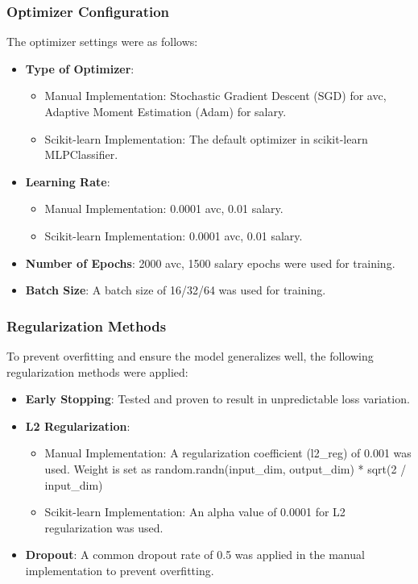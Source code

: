 \documentclass[a4paper,12pt]{article}
\begin{document}
\subsubsection{Optimizer Configuration}
The optimizer settings were as follows:
\begin{itemize}
    \item \textbf{Type of Optimizer}:
    \begin{itemize}
        \item Manual Implementation: Stochastic Gradient Descent (SGD) for avc, Adaptive Moment Estimation (Adam) for salary.
        \item Scikit-learn Implementation: The default optimizer in scikit-learn MLPClassifier.
    \end{itemize}
    \item \textbf{Learning Rate}:
    \begin{itemize}
        \item Manual Implementation: 0.0001 avc, 0.01 salary.
        \item Scikit-learn Implementation: 0.0001 avc, 0.01 salary.
    \end{itemize}
    \item \textbf{Number of Epochs}: 2000 avc, 1500 salary epochs were used for training.
    \item \textbf{Batch Size}: A batch size of 16/32/64 was used for training.
\end{itemize}

\subsubsection{Regularization Methods}
To prevent overfitting and ensure the model generalizes well, the following regularization methods were applied:
\begin{itemize}
    \item \textbf{Early Stopping}: Tested and proven to result in unpredictable loss variation.
    \item \textbf{L2 Regularization}:
    \begin{itemize}
        \item Manual Implementation: A regularization coefficient (l2\_reg) of 0.001 was used. 
        Weight is set as random.randn(input\_dim, output\_dim) * sqrt(2 / input\_dim)
        \item Scikit-learn Implementation: An alpha value of 0.0001 for L2 regularization was used.
    \end{itemize}
    \item \textbf{Dropout}: A common dropout rate of 0.5 was applied in the manual implementation to prevent overfitting.
\end{itemize}
\end{document}
